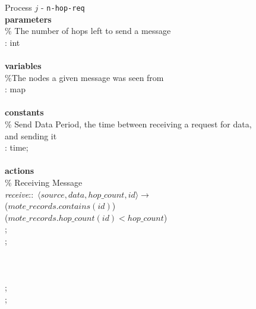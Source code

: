 \begin{figure}[H]
  \centering
  \begin{boxedminipage}{\linewidth}
    \null Process $j$ - \verb|n-hop-req|\\
    \null \textbf{parameters}\\
    \null\qq \% The number of hops left to send a message\\
    \null\qq {}: int\\~\\
    \null \textbf{variables}\\
    \null\qq \%The nodes a given message was seen from\\
    \null\qq {}: map\\~\\
    \null \textbf{constants}\\
    \null\qq \% Send Data Period, the time between receiving a request for data, and sending it\\
    \null\qq {}: time;\\~\\
    \null \textbf{actions}\\
    \null\qq \% Receiving Message\\
    \null\qq \emph{receive}::~$\langle source, data, hop\_count, id\rangle \rightarrow$\\
    \null\qq\qq {} ($mote\_records.contains(id)$) \\
    \null\qq\qq\qq {} ($mote\_records.hop\_count(id) < hop\_count$)  \\
    \null\qq\qq\qq\qq {};\\
    \null\qq\qq\qq\qq {};\\
    \null\qq\qq\qq\qq {}\\
    \null\qq\qq\qq {}\\
    \null\qq\qq {}\\
    \null\qq\qq\qq {};\\
    \null\qq\qq\qq {};\\
    \null\qq\qq\qq {}\\
    \null\qq\qq {}\\~\\

\end{boxedminipage}
\end{figure}
